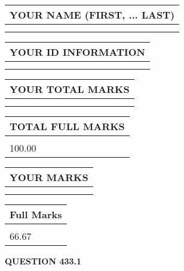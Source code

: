\documentclass{ctexart}
\begin{document}
   
   
   
\newpage 
\setcounter{page}{ 
   433001 } 
   
   
   
   
\noindent\begin{tabular}{|l|}
\hline
YOUR NAME (FIRST, ... LAST)  \\
\hline
 \\ 
 \\ 
\hline
\end{tabular}
\hspace{0.05in} \begin{tabular}{|l|}
\hline
 YOUR   ID   INFORMATION  \\
\hline
 \\ 
 \\ 
\hline
\end{tabular}
   
   
\vspace{0.2in}\noindent\begin{tabular}{|l|}
\hline
YOUR TOTAL MARKS  \\
\hline
 \\ 
 \\ 
\hline
\end{tabular}
\hspace{0.05in} \begin{tabular}{|l|}
\hline
TOTAL FULL MARKS  \\
\hline
 \\ 
100.00 \\
\hline
\end{tabular}
   
   
 \vspace{0.2in}
 
 
 
 
   
   
  
\vspace{0.2in}
  
\noindent\begin{tabular}{|l|}
\hline
 YOUR MARKS  \\
\hline
 \\ 
 \\ 
\hline
\end{tabular}
\hspace{0.05in} \begin{tabular}{|l|}
\hline
 Full Marks  \\
\hline
 \\ 
66.67 \\
\hline
\end{tabular}
{\textbf{\Large{QUESTION
433.1 
}}}
  
\end{document}
